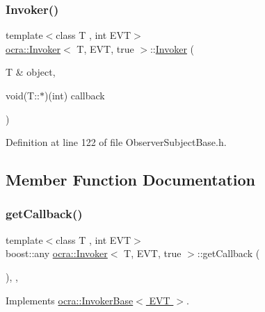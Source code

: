 \subsubsection{\texorpdfstring{Invoker()}{Invoker()}}
{\footnotesize\ttfamily template$<$class T , int E\+VT$>$ \\
\hyperlink{classocra_1_1Invoker}{ocra\+::\+Invoker}$<$ T, E\+VT, true $>$\+::\hyperlink{classocra_1_1Invoker}{Invoker} (\begin{DoxyParamCaption}\item[{T \&}]{object,  }\item[{void(T\+::$\ast$)(int)}]{callback }\end{DoxyParamCaption})\hspace{0.3cm}{\ttfamily [inline]}}



Definition at line 122 of file Observer\+Subject\+Base.\+h.



\subsection{Member Function Documentation}
\hypertarget{classocra_1_1Invoker_3_01T_00_01EVT_00_01true_01_4_a902cb0e1084dc60929920a56631c8586}{}\label{classocra_1_1Invoker_3_01T_00_01EVT_00_01true_01_4_a902cb0e1084dc60929920a56631c8586} 
\subsubsection{\texorpdfstring{get\+Callback()}{getCallback()}}
{\footnotesize\ttfamily template$<$class T , int E\+VT$>$ \\
boost\+::any \hyperlink{classocra_1_1Invoker}{ocra\+::\+Invoker}$<$ T, E\+VT, true $>$\+::get\+Callback (\begin{DoxyParamCaption}{ }\end{DoxyParamCaption})\hspace{0.3cm}{\ttfamily [inline]}, {\ttfamily [protected]}, {\ttfamily [virtual]}}



Implements \hyperlink{classocra_1_1InvokerBase_aab9488dbb26120ccfa7c77be11c01ba9}{ocra\+::\+Invoker\+Base$<$ E\+V\+T $>$}.



